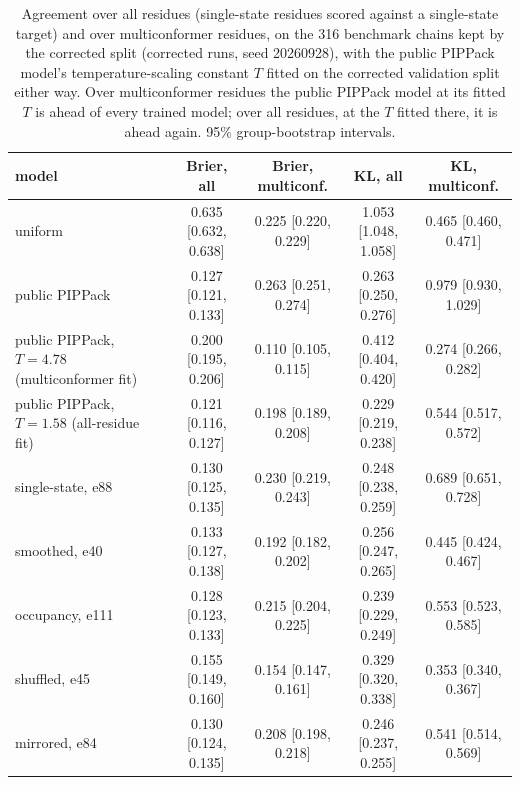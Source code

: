\documentclass[10pt,a4paper]{article}
\begin{document}
\begin{table}[!htbp]
\centering
\caption{Agreement over all residues (single-state residues scored against a single-state target) and over multiconformer residues, on the 316 benchmark chains kept by the corrected split (corrected runs, seed 20260928), with the public PIPPack model's temperature-scaling constant $T$ fitted on the corrected validation split either way. Over multiconformer residues the public PIPPack model at its fitted $T$ is ahead of every trained model; over all residues, at the $T$ fitted there, it is ahead again. 95\% group-bootstrap intervals.}
\label{tab:allres}
\scriptsize\setlength{\tabcolsep}{3pt}
\begin{tabular}{@{}lcccc@{}}
\toprule
model & Brier, all & Brier, multiconf. & KL, all & KL, multiconf. \\
\midrule
uniform & 0.635 [0.632, 0.638] & 0.225 [0.220, 0.229] & 1.053 [1.048, 1.058] & 0.465 [0.460, 0.471] \\
public PIPPack & 0.127 [0.121, 0.133] & 0.263 [0.251, 0.274] & 0.263 [0.250, 0.276] & 0.979 [0.930, 1.029] \\
public PIPPack, $T=4.78$ (multiconformer fit) & 0.200 [0.195, 0.206] & 0.110 [0.105, 0.115] & 0.412 [0.404, 0.420] & 0.274 [0.266, 0.282] \\
public PIPPack, $T=1.58$ (all-residue fit) & 0.121 [0.116, 0.127] & 0.198 [0.189, 0.208] & 0.229 [0.219, 0.238] & 0.544 [0.517, 0.572] \\
single-state, e88 & 0.130 [0.125, 0.135] & 0.230 [0.219, 0.243] & 0.248 [0.238, 0.259] & 0.689 [0.651, 0.728] \\
smoothed, e40 & 0.133 [0.127, 0.138] & 0.192 [0.182, 0.202] & 0.256 [0.247, 0.265] & 0.445 [0.424, 0.467] \\
occupancy, e111 & 0.128 [0.123, 0.133] & 0.215 [0.204, 0.225] & 0.239 [0.229, 0.249] & 0.553 [0.523, 0.585] \\
shuffled, e45 & 0.155 [0.149, 0.160] & 0.154 [0.147, 0.161] & 0.329 [0.320, 0.338] & 0.353 [0.340, 0.367] \\
mirrored, e84 & 0.130 [0.124, 0.135] & 0.208 [0.198, 0.218] & 0.246 [0.237, 0.255] & 0.541 [0.514, 0.569] \\
\bottomrule
\end{tabular}
\end{table}
\end{document}
